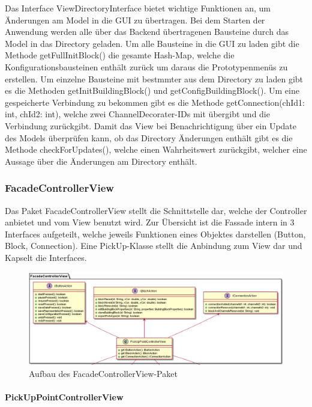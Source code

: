 \documentclass[parskip=full]{scrartcl}
\begin{document}
Das Interface ViewDirectoryInterface bietet wichtige Funktionen an, um Änderungen am Model in die GUI zu übertragen. 
Bei dem Starten der Anwendung werden alle über das Backend übertragenen Bausteine durch das Model in das Directory geladen. Um alle Bausteine in die GUI zu laden gibt die Methode getFullInitBlock() die gesamte Hash-Map, welche die Konfigurationsbausteinen enthält zurück um daraus die Prototypenmenüs zu erstellen. Um einzelne Bausteine mit bestmmter aus dem Directory zu laden gibt es die Methoden getInitBuildingBlock() und getConfigBuildingBlock(). Um eine gespeicherte Verbindung zu bekommen gibt es die Methode getConnection(chId1: int, chId2: int), welche zwei ChannelDecorater-IDs mit übergibt und die Verbindung zurückgibt.
Damit das View bei Benachrichtigung über ein Update des Models überprüfen kann, ob das Directory Änderungen enthält gibt es die Methode checkForUpdates(), welche einen Wahrheitswert zurückgibt, welcher eine Aussage über die Änderungen am Directory enthält.

\subsubsection{FacadeControllerView}

Das Paket FacadeControllerView stellt die Schnittstelle dar, welche der Controller anbietet und vom View benutzt wird. Zur Übersicht ist die Fassade intern in 3 Interfaces aufgeteilt, welche jeweils Funktionen eines Objektes darstellen (Button, Block, Connection). Eine PickUp-Klasse stellt die Anbindung zum View dar und Kapselt die Interfaces.

\begin{figure}[htbp]
	\begin{center}
		\includegraphics[width = 14 cm]{Grafiken/FacadeControllerViewNamespace.png}
		\caption{Aufbau des FacadeControllerView-Paket}
		\label{Entwurf_Grob}
	\end{center}
\end{figure}

\paragraph{PickUpPointControllerView}
\end{document}
